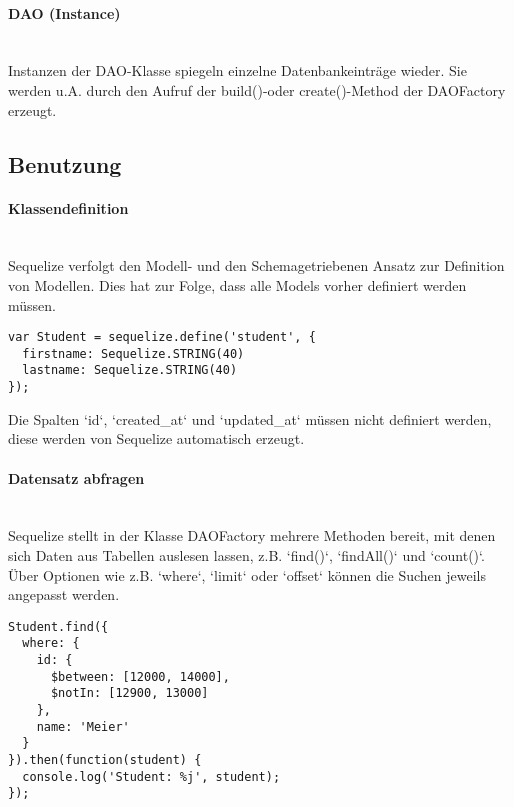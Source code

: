\paragraph{DAO (Instance)} \hspace{0pt} \\
Instanzen der DAO-Klasse spiegeln einzelne Datenbankeinträge wieder. Sie werden u.A. durch den Aufruf der build()-oder create()-Method der DAOFactory erzeugt.


\subsection{Benutzung}

\paragraph{Klassendefinition} \hspace{0pt} \\

Sequelize verfolgt den Modell- und den Schemagetriebenen Ansatz zur Definition von Modellen. Dies hat zur Folge, dass alle Models vorher definiert werden müssen.

\begin{lstlisting}[caption=Klassendefinition (Sequelize)]
var Student = sequelize.define('student', {
  firstname: Sequelize.STRING(40)
  lastname: Sequelize.STRING(40)
});	
\end{lstlisting}

Die Spalten `id`, `created\_at` und `updated\_at` müssen nicht definiert werden, diese werden von Sequelize automatisch erzeugt.


\paragraph{Datensatz abfragen} \hspace{0pt} \\

Sequelize stellt in der Klasse DAOFactory mehrere Methoden bereit, mit denen sich Daten aus Tabellen auslesen lassen, z.B. `find()`, `findAll()` und `count()`. Über Optionen wie z.B. `where`, `limit` oder `offset` können die Suchen jeweils angepasst werden.

\begin{lstlisting}[caption=Datensatz abfragen (Sequelize)]
Student.find({
  where: {
    id: {
      $between: [12000, 14000],
      $notIn: [12900, 13000]
    },
    name: 'Meier'
  }
}).then(function(student) {
  console.log('Student: %j', student);
});	
\end{lstlisting}



